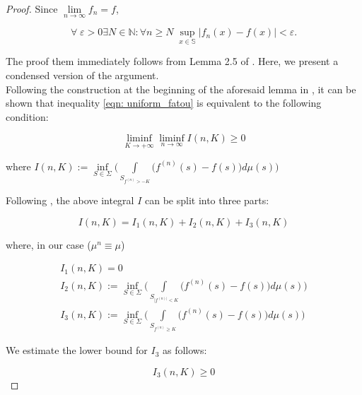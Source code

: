 \documentclass{amsart}
\theoremstyle{named}
\begin{document}
\begin{proof}

    Since $\lim\limits_{n \rightarrow \infty}f_n = f$,
    
    \begin{equation*}
        \forall \; \varepsilon > 0 \exists N \in \mathbb{N}: \forall n \geq N \; \sup\limits_{x \in \mathbb{S}}|f_n(x) - f(x)| < \varepsilon.
    \end{equation*}

    The proof them immediately follows from Lemma 2.5 of \cite{feinberg2015uniform}. Here, we present a condensed version of the argument. \\ 

    Following the construction at the beginning of the aforesaid lemma in \cite{feinberg2015uniform}, it can be shown that inequality \ref{eqn: uniform_fatou} is equivalent to the following condition:
    
    \begin{equation*}
        \liminf\limits_{K \rightarrow +\infty} \liminf\limits_{n \rightarrow \infty} I(n,K) \geq 0
    \end{equation*}

    where $I(n,K) := \inf\limits_{S \in \Sigma} \bigg( \int\limits_{S_{f^{(n)} > -K}} \Big( f^{(n)}(s) - f(s) \Big) d\mu(s) \bigg) $

    Following \cite{feinberg2015uniform}, the above integral $I$ can be split into three parts:

    \begin{equation*}
        I(n,K) = I_1 (n,K) + I_2 (n,K) + I_3 (n,K)
    \end{equation*}

    where, in our case ($\mu^{n} \equiv \mu$) 

    \begin{gather*}
        I_1 (n,K) = 0 \\ 
        I_2 (n,K) := \inf\limits_{S \in \Sigma} \bigg( \int\limits_{S_{|f^{(n)|} < K}} \Big( f^{(n)}(s) - f(s) \Big) d\mu(s) \bigg) \\ 
        I_3 (n,K) := \inf\limits_{S \in \Sigma} \bigg( \int\limits_{S_{f^{(n)}\geq K}} \Big( f^{(n)}(s) - f(s) \Big) d\mu(s) \bigg)
    \end{gather*}

    We estimate the lower bound for $I_3$ as follows:

    \begin{equation*}
        I_3 (n,K) \geq 0
    \end{equation*}


\end{proof}
\end{document}

